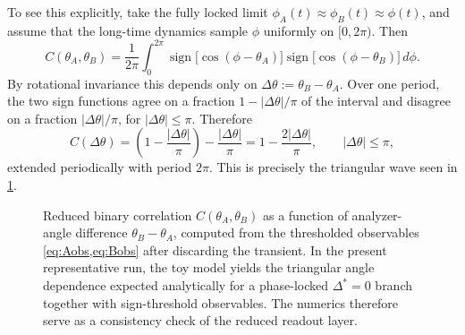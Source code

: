 \documentclass[11pt]{article}
\begin{document}
        To see this explicitly, take the fully locked limit \(\phi_A(t)\approx \phi_B(t)\approx \phi(t)\), and assume that the long-time dynamics sample \(\phi\) uniformly on \([0,2\pi)\). Then
        \begin{equation}
            C(\theta_A,\theta_B)
            =
            \frac{1}{2\pi}
            \int_0^{2\pi}
            \operatorname{sign}\!\big[\cos(\phi-\theta_A)\big]
            \operatorname{sign}\!\big[\cos(\phi-\theta_B)\big]
            \,d\phi.
            \label{eq:C_integral}
        \end{equation}
        By rotational invariance this depends only on \(\Delta\theta:=\theta_B-\theta_A\). Over one period, the two sign functions agree on a fraction \(1-|\Delta\theta|/\pi\) of the interval and disagree on a fraction \(|\Delta\theta|/\pi\), for \(|\Delta\theta|\le \pi\). Therefore
        \begin{equation}
            C(\Delta\theta)
            =
            \left(1-\frac{|\Delta\theta|}{\pi}\right)
            -
            \frac{|\Delta\theta|}{\pi}
            =
            1-\frac{2|\Delta\theta|}{\pi},
            \qquad
            |\Delta\theta|\le \pi,
            \label{eq:C_triangle}
        \end{equation}
        extended periodically with period \(2\pi\). This is precisely the triangular wave seen in \cref{fig:delay_phase_correlation}.

        \begin{figure}[h]
            \centering
            \caption{Reduced binary correlation \(C(\theta_A,\theta_B)\) as a function of analyzer-angle difference \(\theta_B-\theta_A\), computed from the thresholded observables \cref{eq:Aobs,eq:Bobs} after discarding the transient. In the present representative run, the toy model yields the triangular angle dependence expected analytically for a phase-locked \(\Delta^\ast=0\) branch together with sign-threshold observables. The numerics therefore serve as a consistency check of the reduced readout layer.}
            \label{fig:delay_phase_correlation}
        \end{figure}
\end{document}
